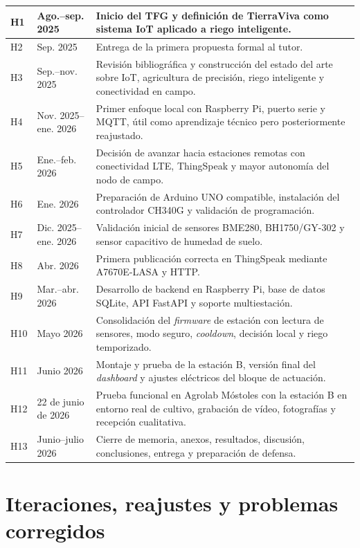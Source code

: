 \begin{longtable}{|p{}|p{}|p{}|}
H1 & Ago.--sep. 2025 & Inicio del TFG y definición de TierraViva como sistema IoT aplicado a riego inteligente. \\
\hline
H2 & Sep. 2025 & Entrega de la primera propuesta formal al tutor. \\
\hline
H3 & Sep.--nov. 2025 & Revisión bibliográfica y construcción del estado del arte sobre IoT, agricultura de precisión, riego inteligente y conectividad en campo. \\
\hline
H4 & Nov. 2025--ene. 2026 & Primer enfoque local con Raspberry Pi, puerto serie y MQTT, útil como aprendizaje técnico pero posteriormente reajustado. \\
\hline
H5 & Ene.--feb. 2026 & Decisión de avanzar hacia estaciones remotas con conectividad LTE, ThingSpeak y mayor autonomía del nodo de campo. \\
\hline
H6 & Ene. 2026 & Preparación de Arduino UNO compatible, instalación del controlador CH340G y validación de programación. \\
\hline
H7 & Dic. 2025--ene. 2026 & Validación inicial de sensores BME280, BH1750/GY-302 y sensor capacitivo de humedad de suelo. \\
\hline
H8 & Abr. 2026 & Primera publicación correcta en ThingSpeak mediante A7670E-LASA y HTTP. \\
\hline
H9 & Mar.--abr. 2026 & Desarrollo de backend en Raspberry Pi, base de datos SQLite, API FastAPI y soporte multiestación. \\
\hline
H10 & Mayo 2026 & Consolidación del \textit{firmware} de estación con lectura de sensores, modo seguro, \textit{cooldown}, decisión local y riego temporizado. \\
\hline
H11 & Junio 2026 & Montaje y prueba de la estación B, versión final del \textit{dashboard} y ajustes eléctricos del bloque de actuación. \\
\hline
H12 & 22 de junio de 2026 & Prueba funcional en Agrolab Móstoles con la estación B en entorno real de cultivo, grabación de vídeo, fotografías y recepción cualitativa. \\
\hline
H13 & Junio--julio 2026 & Cierre de memoria, anexos, resultados, discusión, conclusiones, entrega y preparación de defensa. \\
\hline
\end{longtable}

\normalsize

\section{Iteraciones, reajustes y problemas corregidos}

